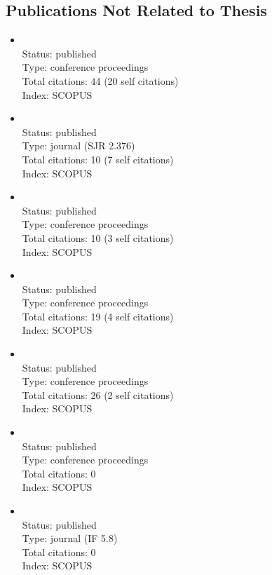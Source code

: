 \begin{refsection}
\section*{Publications Not Related to Thesis}
    \begin{itemize}
		\item{}\vspace{2mm}\\Status: published\\Type: conference proceedings\\Total citations: 44 (20 self citations)\\Index: SCOPUS
		\item{}\vspace{2mm}\\Status: published\\Type: journal (SJR 2.376)\\Total citations: 10 (7 self citations)\\Index: SCOPUS
		\item{}\vspace{2mm}\\Status: published\\Type: conference proceedings\\Total citations: 10 (3 self citations)\\Index: SCOPUS
		\item{}\vspace{2mm}\\Status: published\\Type: conference proceedings\\Total citations: 19 (4 self citations)\\Index: SCOPUS
		\item{}\vspace{2mm}\\Status: published\\Type: conference proceedings\\Total citations: 26 (2 self citations)\\Index: SCOPUS
		\item{}\vspace{2mm}\\Status: published\\Type: conference proceedings\\Total citations: 0\\Index: SCOPUS
		\item{}\vspace{2mm}\\Status: published\\Type: journal (IF 5.8)\\Total citations: 0\\Index: SCOPUS

\end{itemize}
\end{refsection}
